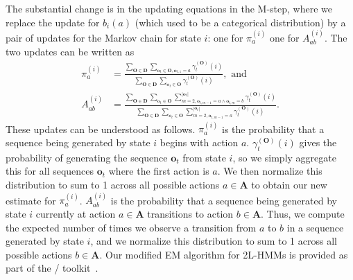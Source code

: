 The substantial change is in the updating equations in the M-step,
where we replace the update for $b_i(a)$ (which used to be a categorical
distribution) by a pair of updates for the Markov chain for state $i$: one
for $\pi^{(i)}_a$ one for $A^{(i)}_{ab}$. The two updates can be written as
\begin{align}
  \pi^{(i)}_{a}
  &= \frac{\sum_{\mathbf{O} \in \mathbf{D}} \sum_{\mathbf{o}_t \in
  \mathbf{O},\mathbf{o}_{t,1} = a} \gamma^{(\mathbf{O})}_t(i)}
  {\sum_{\mathbf{O} \in \mathbf{D}} \sum_{\mathbf{o}_t \in \mathbf{O}}
  \gamma^{(\mathbf{O})}_t(i)}, \text{ and }\\
  A^{(i)}_{ab}
  &= \frac{\sum_{\mathbf{O} \in \mathbf{D}} \sum_{\mathbf{o}_t \in \mathbf{O}}
  \sum_{m=2,\mathbf{o}_{t,m-1}=a \land \mathbf{o}_{t,m} = b}^{|\mathbf{o}_{t}|}
  \gamma^{(\mathbf{O})}_t(i)}
  {\sum_{\mathbf{O} \in \mathbf{D}} \sum_{\mathbf{o}_t \in \mathbf{O}}
  \sum_{m=2,\mathbf{o}_{t,m-1}=a}^{|\mathbf{o}_{t}|} \gamma^{(\mathbf{O})}_t(i)}.
\end{align}
These updates can be understood as follows. $\pi^{(i)}_a$ is the
probability that a sequence being generated by state $i$ begins with action
$a$. $\gamma^{(\mathbf{O})}_t(i)$ gives the probability of generating the
sequence $\mathbf{o}_t$ from state $i$, so we simply aggregate this for all
sequences $\mathbf{o}_t$ where the first action is $a$. We then normalize
this distribution to sum to 1 across all possible actions $a \in
\mathbf{A}$ to obtain our new estimate for $\pi^{(i)}_a$.  $A^{(i)}_{ab}$
is the probability that a sequence being generated by state $i$ currently
at action $a \in \mathbf{A}$ transitions to action $b \in \mathbf{A}$.
Thus, we compute the expected number of times we observe a transition from
$a$ to $b$ in a sequence generated by state $i$, and we normalize this
distribution to sum to 1 across all possible actions $b \in \mathbf{A}$.
Our modified EM algorithm for 2L-HMMs is provided as part of the \meta/
toolkit~\citemeta{}.
